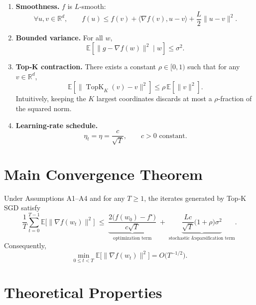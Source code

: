 \documentclass{article}
\newcommand{\TopK}{\operatorname{TopK}}
\newcommand{\EE}{\mathbb{E}}
\newcommand{\RR}{\mathbb{R}}
\begin{document}
\begin{enumerate}
  \item[\textbf{A1}] \textbf{Smoothness.} $f$ is $L$‑smooth:
  \[
    \forall u,v\in\RR^d,\qquad 
    f(u)\le f(v)+\langle\nabla f(v),u-v\rangle+\frac{L}{2}\|u-v\|^2 .
  \]
  \item[\textbf{A2}] \textbf{Bounded variance.} For all $w$,
  \[
    \EE\!\left[\|g-\nabla f(w)\|^2\mid w\right]\le\sigma^2 .
  \]
  \item[\textbf{A3}] \textbf{Top‑K contraction.} There exists a constant
  $\rho\in[0,1)$ such that for any $v\in\RR^d$,
  \[
    \EE\!\left[\big\|\TopK_K(v)-v\big\|^2\right]\le\rho\,\EE\!\left[\|v\|^2\right].
  \]
  Intuitively, keeping the $K$ largest coordinates discards at most a
  $\rho$‑fraction of the squared norm.
  \item[\textbf{A4}] \textbf{Learning‑rate schedule.}
  \[
    \eta_t=\eta=\frac{c}{\sqrt{T}},\qquad c>0\text{ constant}.
  \]
\end{enumerate}

\section*{Main Convergence Theorem}

\begin{theorem}\label{thm:main}
Under Assumptions A1–A4 and for any $T\ge 1$, the iterates generated by
Top‑K SGD satisfy
\[
\frac{1}{T}\sum_{t=0}^{T-1}\EE\!\big[\|\nabla f(w_t)\|^2\big]
\;\le\;
\underbrace{\frac{2\big(f(w_0)-f^\star\big)}{c\sqrt{T}}}_{\text{optimization term}}
\;+\;
\underbrace{\frac{L c}{\sqrt{T}}\big(1+\rho\big)\sigma^2}_{\text{stochastic \& sparsification term}} .
\]
Consequently,
\[
\min_{0\le t<T}\EE\!\big[\|\nabla f(w_t)\|^2\big]=O\!\big(T^{-1/2}\big).
\]
\end{theorem}

\section*{Theoretical Properties}
\end{document}
